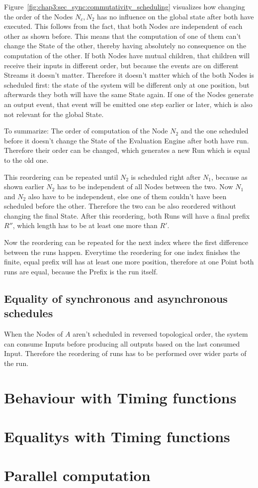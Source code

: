Figure~\ref{fig:chap3:sec_sync:commutativity_scheduling} visualizes how changing the order of the Nodes \(N_c, N_2\) has no influence on the global state after both have executed.
This follows from the fact, that both Nodes are independent of each other as shown before.
This means that the computation of one of them can't change the State of the other, thereby having absolutely no consequence on the computation of the other.
If both Nodes have mutual children, that children will receive their inputs in different order, but because the events are  on different Streams it doesn't matter.
Therefore it doesn't matter which of the both Nodes is scheduled first: the state of the system will be different only at one position, but afterwards they both will have the same State again.
If one of the Nodes generate an output event, that event will be emitted one step earlier or later, which is also not relevant for the global State.

To summarize: The order of computation of the Node \(N_2\) and the one scheduled before it doesn't change the State of the Evaluation Engine after both have run.
Therefore their order can be changed, which generates a new Run which is equal to the old one.

This reordering can be repeated until \(N_2\) is scheduled right after \(N_1\), because as shown earlier \(N_2\) has to be independent of all Nodes between the two.
Now \(N_1\) and \(N_2\) also have to be independent, else one of them couldn't have been scheduled before the other.
Therefore the two can be also reordered without changing the final State.
After this reordering, both Runs will have a final prefix \(R''\), which length has to be at least one more than \(R'\).

Now the reordering can be repeated for the next index where the first difference between the runs happen.
Everytime the reordering for one index finishes the finite, equal prefix will has at least one more position, therefore at one Point both runs are equal, because the Prefix is the run itself.


\subsection{Equality of synchronous and asynchronous schedules}
\label{sec:concepts:equalitys_without_timing:sync_async}

When the Nodes of \(A\) aren't scheduled in reversed topological order, the system can consume Inputs before producing all outputs based on the last consumed Input.
Therefore the reordering of runs has to be performed over wider parts of the run.

\section{Behaviour with Timing functions}
\section{Equalitys with Timing functions}
\section{Parallel computation}
